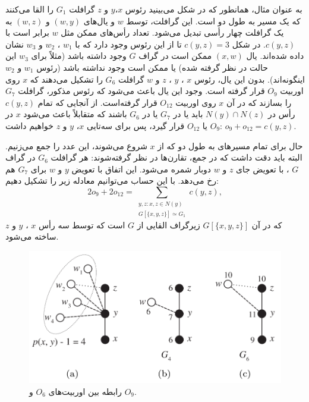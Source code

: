 به عنوان مثال، همانطور که در شکل  می‌بینید رئوس $x$،$y$ و $z$ گرافلت $G_1$ را القا می‌کنند که یک مسیر به طول دو است. این گرافلت، توسط $w$ و یال‌های $(w,y)$ و $(w,z)$ به یک گرافلت چهار رأسی تبدیل می‌شود. تعداد رأس‌های ممکن مثل $w$ برابر است با $c(y,z)$. در شکل $c(y,z) = 3$ تا از این رئوس وجود دارد که با $w_1$ ، $w_2$ و $w_3$ نشان داده شده‌اند. یال $(x,w)$ ممکن است در گراف $G$ وجود داشته باشد (مثلاً برای $w_3$ این حالت در نظر گرفته شده) یا ممکن است وجود نداشته باشد (رئوس $w_1$ و $w_2$ اینگونه‌اند). بدون این یال، رئوس $x$ ، $y$ ، $z$ و $w$ گرافلت $G_6$ را تشکیل می‌دهند که $x$ روی اوربیت $O_9$ قرار گرفته است. وجود این یال باعث می‌شود که رئوس مذکور، گرافلت $G_7$ را بسازند که در آن $x$ روی اوربیت $O_{12}$ قرار گرفته‌است. از آنجایی که تمام $c(y,z)$ رأس در $N(y) \cap N(z)$ باید یا در $G_7$ یا در $G_6$ باشند که متقابلاً باعث می‌شود $x$ در $O_9$ یا $O_{12}$ قرار گیرد، پس برای سه‌تایی $x$، $y$ و $z$ خواهیم داشت: $o_9 + o_{12} = c(y,z)$.

حال برای تمام مسیرهای به طول دو که از $x$ شروع می‌شوند، این عدد را جمع می‌زنیم. البته باید دقت داشت که در جمع، تقارن‌ها در نظر گرفته‌شوند: هر گرافلت $G_6$  در گراف $G$ ، با تعویض جای $z$ و $w$ دوبار شمره می‌شود. این اتفاق با تعویض $y$‌ و $w$ برای $G_7$ هم رخ می‌دهد. با این حساب می‌توانیم معادله زیر را تشکیل دهیم:
\begin{equation*}
2o_9+2o_{12} = \sum_{\substack{y,z: x,z\in N(y)\\G[\{x,y,z\}] \simeq G_1 }}c(y,z),
\end{equation*}
که در آن $G[\{x,y,z\}]$ زیرگراف القایی از $G$ است که توسط سه رأس $x$ ، $y$ و $z$ ساخته می‌شود.

\begin{figure}[b]
\centering
\includegraphics[scale=0.3]{./4-node-graphlet-2.png}
\caption{رابطه بین اوربیت‌های $O_6$ و $O_9$.}
\label{fig:o6-o9-relation}
\end{figure}

